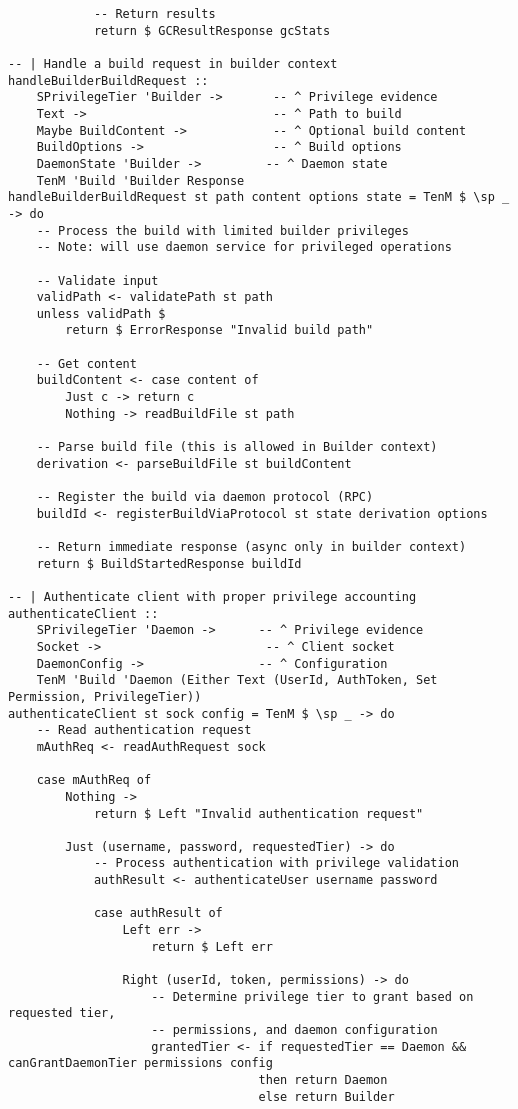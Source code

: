 \documentclass{article}
\begin{document}
\begin{tcolorbox}[title=Ten/Daemon/Server.hs Changes]
\begin{verbatim}
            -- Return results
            return $ GCResultResponse gcStats

-- | Handle a build request in builder context
handleBuilderBuildRequest ::
    SPrivilegeTier 'Builder ->       -- ^ Privilege evidence
    Text ->                          -- ^ Path to build
    Maybe BuildContent ->            -- ^ Optional build content
    BuildOptions ->                  -- ^ Build options
    DaemonState 'Builder ->         -- ^ Daemon state
    TenM 'Build 'Builder Response
handleBuilderBuildRequest st path content options state = TenM $ \sp _ -> do
    -- Process the build with limited builder privileges
    -- Note: will use daemon service for privileged operations

    -- Validate input
    validPath <- validatePath st path
    unless validPath $
        return $ ErrorResponse "Invalid build path"

    -- Get content
    buildContent <- case content of
        Just c -> return c
        Nothing -> readBuildFile st path

    -- Parse build file (this is allowed in Builder context)
    derivation <- parseBuildFile st buildContent

    -- Register the build via daemon protocol (RPC)
    buildId <- registerBuildViaProtocol st state derivation options

    -- Return immediate response (async only in builder context)
    return $ BuildStartedResponse buildId

-- | Authenticate client with proper privilege accounting
authenticateClient ::
    SPrivilegeTier 'Daemon ->      -- ^ Privilege evidence
    Socket ->                       -- ^ Client socket
    DaemonConfig ->                -- ^ Configuration
    TenM 'Build 'Daemon (Either Text (UserId, AuthToken, Set Permission, PrivilegeTier))
authenticateClient st sock config = TenM $ \sp _ -> do
    -- Read authentication request
    mAuthReq <- readAuthRequest sock

    case mAuthReq of
        Nothing ->
            return $ Left "Invalid authentication request"

        Just (username, password, requestedTier) -> do
            -- Process authentication with privilege validation
            authResult <- authenticateUser username password

            case authResult of
                Left err ->
                    return $ Left err

                Right (userId, token, permissions) -> do
                    -- Determine privilege tier to grant based on requested tier,
                    -- permissions, and daemon configuration
                    grantedTier <- if requestedTier == Daemon && canGrantDaemonTier permissions config
                                   then return Daemon
                                   else return Builder


\end{verbatim}
\end{tcolorbox}
\end{document}
